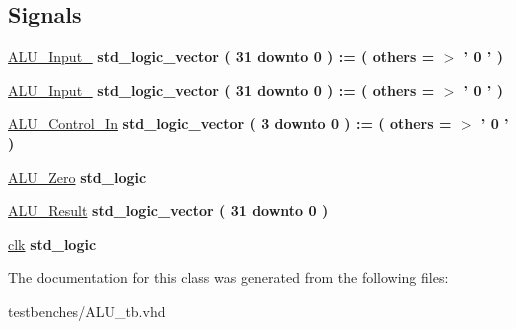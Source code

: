 \subsection*{\-Signals}
 \begin{DoxyCompactItemize}
\item 
\hypertarget{class_a_l_u__tb_1_1behavior_a8c429fd721a833d34cba27d8fe50acab}{\hyperlink{class_a_l_u__tb_1_1behavior_a8c429fd721a833d34cba27d8fe50acab}{\-A\-L\-U\-\_\-\-Input\-\_} {\bfseries std\-\_\-logic\-\_\-vector (   31    downto    0  )  \-:= (  others  = $>$ '  0  '  ) } }\label{class_a_l_u__tb_1_1behavior_a8c429fd721a833d34cba27d8fe50acab}

\item 
\hypertarget{class_a_l_u__tb_1_1behavior_a4f7ecfcf9e81ab34edf691bc9f47ae85}{\hyperlink{class_a_l_u__tb_1_1behavior_a4f7ecfcf9e81ab34edf691bc9f47ae85}{\-A\-L\-U\-\_\-\-Input\-\_} {\bfseries std\-\_\-logic\-\_\-vector (   31    downto    0  )  \-:= (  others  = $>$ '  0  '  ) } }\label{class_a_l_u__tb_1_1behavior_a4f7ecfcf9e81ab34edf691bc9f47ae85}

\item 
\hypertarget{class_a_l_u__tb_1_1behavior_a4fdf00b8a3e238ce4312f42ae5d8f8b8}{\hyperlink{class_a_l_u__tb_1_1behavior_a4fdf00b8a3e238ce4312f42ae5d8f8b8}{\-A\-L\-U\-\_\-\-Control\-\_\-\-In} {\bfseries std\-\_\-logic\-\_\-vector (   3    downto    0  )  \-:= (  others  = $>$ '  0  '  ) } }\label{class_a_l_u__tb_1_1behavior_a4fdf00b8a3e238ce4312f42ae5d8f8b8}

\item 
\hypertarget{class_a_l_u__tb_1_1behavior_a4237c38378b6a76e30a521e27053321f}{\hyperlink{class_a_l_u__tb_1_1behavior_a4237c38378b6a76e30a521e27053321f}{\-A\-L\-U\-\_\-\-Zero} {\bfseries std\-\_\-logic } }\label{class_a_l_u__tb_1_1behavior_a4237c38378b6a76e30a521e27053321f}

\item 
\hypertarget{class_a_l_u__tb_1_1behavior_affbe09d36e6381e4075f5f4bdf87749d}{\hyperlink{class_a_l_u__tb_1_1behavior_affbe09d36e6381e4075f5f4bdf87749d}{\-A\-L\-U\-\_\-\-Result} {\bfseries std\-\_\-logic\-\_\-vector (   31    downto    0  ) } }\label{class_a_l_u__tb_1_1behavior_affbe09d36e6381e4075f5f4bdf87749d}

\item 
\hypertarget{class_a_l_u__tb_1_1behavior_acb8805c41e29b9bb490d97fed2b1f020}{\hyperlink{class_a_l_u__tb_1_1behavior_acb8805c41e29b9bb490d97fed2b1f020}{clk} {\bfseries std\-\_\-logic } }\label{class_a_l_u__tb_1_1behavior_acb8805c41e29b9bb490d97fed2b1f020}

\end{DoxyCompactItemize}


\-The documentation for this class was generated from the following files\-:\begin{DoxyCompactItemize}
\item 
testbenches/\-A\-L\-U\-\_\-tb.\-vhd\end{DoxyCompactItemize}
